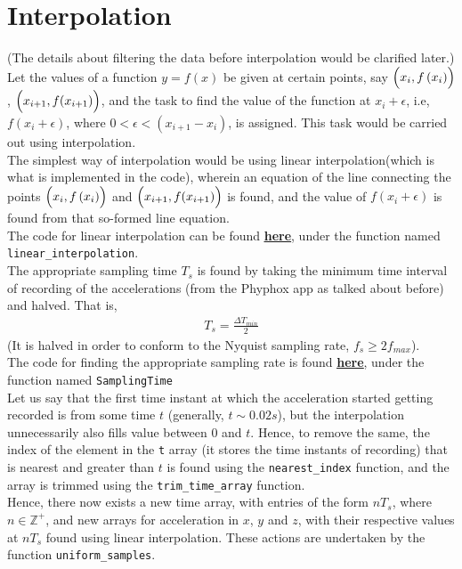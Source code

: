 \documentclass[oneside]{book}
\begin{document}
\chapter{Interpolation}
(The details about filtering the data before interpolation would be clarified later.)\\
Let the values of a function $y = f(x)$ be given at certain points, say $\Bigl(x_i,f\left(x_i\right)\Bigr)$, $\Bigl(x_{i+1}, f(x_{i+1})\Bigr)$, and the task to find the value of the function at $x_i + \epsilon$, i.e,\\ $f(x_i + \epsilon)$, where $0<\epsilon < (x_{i+1} - x_i)$, is assigned. This task would be carried out using interpolation. \\
\bigskip
The simplest way of interpolation would be using linear interpolation(which is what is implemented in the code), wherein an equation of the line connecting the points $\Bigl(x_i,f\left(x_i\right)\Bigr)$ and $\Bigl(x_{i+1}, f(x_{i+1})\Bigr)$ is found, and the value of $f(x_i + \epsilon)$ is found from that so-formed line equation.\\
\bigskip
The code for linear interpolation can be found \href{https://github.com/HarryNyquist/Odometry/blob/main/Codes/2_DataFunctions.cpp}{\underline{\textbf{here}}}, under the function named \verb|linear_interpolation|.\\
\bigskip
The appropriate sampling time $T_s$ is found by taking the minimum time interval of recording of the accelerations (from the Phyphox app as talked about before) and halved. That is,
\begin{align}
    T_s = \frac{\Delta T_{min}}{2}
\end{align}
(It is halved in order to conform to the Nyquist sampling rate, $f_s \geq 2f_{max}$). \\
The code for finding the appropriate sampling rate is found \href{https://github.com/HarryNyquist/Odometry/blob/main/Codes/2_DataFunctions.cpp}{\underline{\textbf{here}}}, under the function named \verb|SamplingTime| \\
\bigskip
Let us say that the first time instant at which the acceleration started getting recorded is from some time $t$ (generally, $t \sim 0.02s$), but the interpolation unnecessarily also fills value between 0 and $t$. Hence, to remove the same, the index of the element in the \verb|t| array (it stores the time instants of recording) that is nearest and greater than $t$ is found using the \verb|nearest_index| function, and the array is trimmed using the \verb|trim_time_array| function. \\
\bigskip
Hence, there now exists a new time array, with entries of the form $nT_s$, where $n \in \mathbb{Z}^+$, and new arrays for acceleration in $x$, $y$ and $z$, with their respective values at $nT_s$ found using linear interpolation. These actions are undertaken by the function \verb|uniform_samples|. \\
\end{document}
